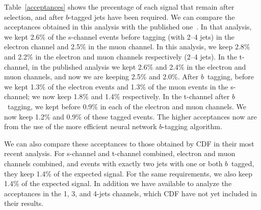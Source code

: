Table~\ref{acceptances} shows the precentage of each signal that
remain after selection, and after $b$-tagged jets have been
required. We can compare the acceptances obtained in this analysis
with the published one~\cite{run2-d0-plb}. In that analysis, we kept
2.6\% of the s-channel events before tagging (with 2--4 jets) in the
electron channel and 2.5\% in the muon channel. In this analysis, we
keep 2.8\% and 2.2\% in the electron and muon channels respectively
(2--4 jets). In the t-channel, in the published analysis we kept 2.6\%
and 2.4\% in the electron and muon channels, and now we are keeping
2.5\% and 2.0\%. After $b$~tagging, before we kept 1.3\% of the
electron events and 1.3\% of the muon events in the s-channel; we now
keep 1.8\% and 1.4\% respectively. In the t-channel after $b$~tagging,
we kept before 0.9\% in each of the electron and muon channels. We now
keep 1.2\% and 0.9\% of these tagged events.  The higher acceptances
now are from the use of the more efficient neural network $b$-tagging
algorithm.

We can also compare these acceptances to those obtained by CDF in
their most recent analysis. For s-channel and t-channel combined,
electron and muon channels combined, and events with exactly two jets
with one or both $b$~tagged, they keep 1.4\% of the expected
signal. For the same requirements, we also keep 1.4\% of the expected
signal. In addition we have available to analyze the acceptances in
the 1, 3, and 4-jets channels, which CDF have not yet included in
their results.

